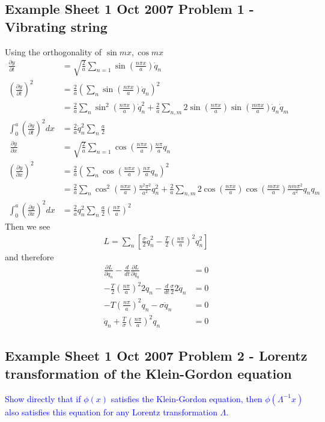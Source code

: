 \documentclass[../main.tex]{subfiles}
\begin{document}
\subsection{Example Sheet 1 Oct 2007 Problem 1 - Vibrating string}
Using the orthogonality of $\sin mx, \cos mx$
\begin{align}
\frac{\partial y}{\partial t}
&=\sqrt{\frac{2}{a}}\sum_{n=1}\sin\left(\frac{n\pi x}{a}\right)\dot{q}_n\\
\left(\frac{\partial y}{\partial t}\right)^2
&=\frac{2}{a}\left(\sum_n\sin\left(\frac{n\pi x}{a}\right)\dot{q}_n\right)^2\\
&=\frac{2}{a}\sum_{n}\sin^2\left(\frac{n\pi x}{a}\right)\dot{q}_n^2+\frac{2}{a}\sum_{n,m}2\sin\left(\frac{n\pi x}{a}\right)\sin\left(\frac{m\pi x}{a}\right)\dot{q}_n\dot{q}_m\\
\int_0^a \left(\frac{\partial y}{\partial t}\right)^2dx
&=\frac{2}{a}\dot{q}_n^2\sum_{n}\frac{a}{2}\\\
%
\frac{\partial y}{\partial x}
&=\sqrt{\frac{2}{a}}\sum_{n=1}\cos\left(\frac{n\pi x}{a}\right)\frac{n\pi}{a}q_n\\
\left(\frac{\partial y}{\partial x}\right)^2
&=\frac{2}{a}\left(\sum_n\cos\left(\frac{n\pi x}{a}\right)\frac{n\pi}{a}q_n\right)^2\\
&=\frac{2}{a}\sum_n\cos^2\left(\frac{n\pi x}{a}\right)\frac{n^2\pi^2}{a^2}q_n^2+\frac{2}{a}\sum_{n,m}2\cos\left(\frac{n\pi x}{a}\right)\cos\left(\frac{m\pi x}{a}\right)\frac{nm\pi^2}{a^2}q_nq_m\\
\int_0^a \left(\frac{\partial y}{\partial x}\right)^2dx
&=\frac{2}{a}q_n^2\sum_{n}\frac{a}{2}\left(\frac{n\pi}{a}\right)^2
\end{align}
Then we see
\begin{align}
L=\sum_{n}\left[\frac{\sigma}{2}\dot{q}_n^2-\frac{T}{2}\left(\frac{n\pi}{a}\right)^2q_n^2\right]
\end{align}
and therefore
\begin{align}
\frac{\partial L}{\partial q_n}-\frac{d}{dt}\frac{\partial L}{\partial \dot{q}_n}&=0\\
-\frac{T}{2}\left(\frac{n\pi}{a}\right)^2 2q_n-\frac{d}{dt}\frac{\sigma}{2}2\dot{q}_n&=0\\
-T\left(\frac{n\pi}{a}\right)^2 q_n-\sigma\ddot{q}_n&=0\\
\ddot{q}_n+\frac{T}{\sigma}\left(\frac{n\pi}{a}\right)^2q_n&=0
\end{align}

\subsection{Example Sheet 1 Oct 2007 Problem 2 - Lorentz transformation of the Klein-Gordon equation}
\textcolor{blue}{Show directly that if $\phi(x)$ satisfies the Klein-Gordon equation, then $\phi(\Lambda^{-1}x)$  also satisfies this equation for any Lorentz transformation $\Lambda$.}\newline
\end{document}
